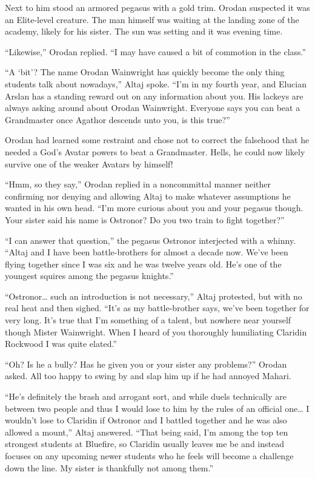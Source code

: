 \documentclass[a4paper,10pt]{book}
\begin{document}
Next to him stood an armored pegasus with a gold trim. Orodan suspected it was an Elite-level creature. The man himself was waiting at the landing zone of the academy, likely for his sister. The sun was setting and it was evening time.\par
“Likewise,” Orodan replied. “I may have caused a bit of commotion in the class.”\par
“A ‘bit’? The name Orodan Wainwright has quickly become the only thing students talk about nowadays,” Altaj spoke. “I’m in my fourth year, and Elucian Arslan has a standing reward out on any information about you. His lackeys are always asking around about Orodan Wainwright. Everyone says you can beat a Grandmaster once Agathor descends unto you, is this true?”\par
Orodan had learned some restraint and chose not to correct the falsehood that he needed a God’s Avatar powers to beat a Grandmaster. Hells, he could now likely survive one of the weaker Avatars by himself!\par
“Hmm, so they say,” Orodan replied in a noncommittal manner neither confirming nor denying and allowing Altaj to make whatever assumptions he wanted in his own head. “I’m more curious about you and your pegasus though. Your sister said his name is Ostronor? Do you two train to fight together?”\par
“I can answer that question,” the pegasus Ostronor interjected with a whinny. “Altaj and I have been battle-brothers for almost a decade now. We’ve been flying together since I was six and he was twelve years old. He’s one of the youngest squires among the pegasus knights.”\par
“Ostronor… such an introduction is not necessary,” Altaj protested, but with no real heat and then sighed. “It’s as my battle-brother says, we’ve been together for very long. It’s true that I’m something of a talent, but nowhere near yourself though Mister Wainwright. When I heard of you thoroughly humiliating Claridin Rockwood I was quite elated.”\par
“Oh? Is he a bully? Has he given you or your sister any problems?” Orodan asked. All too happy to swing by and slap him up if he had annoyed Mahari.\par
“He’s definitely the brash and arrogant sort, and while duels technically are between two people and thus I would lose to him by the rules of an official one… I wouldn’t lose to Claridin if Ostronor and I battled together and he was also allowed a mount,” Altaj answered. “That being said, I’m among the top ten strongest students at Bluefire, so Claridin usually leaves me be and instead focuses on any upcoming newer students who he feels will become a challenge down the line. My sister is thankfully not among them.”\par
\end{document}
